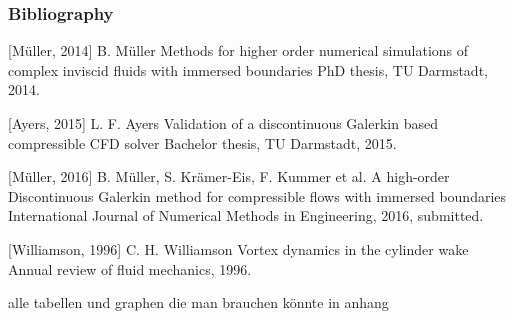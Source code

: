 \documentclass[accentcolor=tud7b,colorbacktitle,inverttitle,landscape,presentation,t]{tudbeamer}
\begin{document}
\begin{frame}[allowframebreaks]
	\frametitle{Bibliography}
\begin{thebibliography}{8}
	[Müller, 2014]
	B. Müller
	\newblock Methods for higher order numerical simulations of complex inviscid fluids with immersed boundaries
	\newblock PhD thesis, TU Darmstadt, 2014.
	
	[Ayers, 2015]
	L. F. Ayers
	\newblock Validation of a discontinuous Galerkin based compressible CFD solver
	\newblock Bachelor thesis, TU Darmstadt, 2015.
	
	[Müller, 2016]
	B. Müller, S. Krämer-Eis, F. Kummer et al.
	\newblock A high-order Discontinuous Galerkin method for compressible flows with immersed boundaries
	\newblock International Journal of Numerical Methods in Engineering, 2016, submitted.
	
	[Williamson, 1996]
	C. H. Williamson
	\newblock Vortex dynamics in the cylinder wake
	\newblock Annual review of fluid mechanics, 1996.
	
\end{thebibliography}
\end{frame}
\begin{frame}
	alle tabellen und graphen die man brauchen könnte in anhang
	\end{frame}	
\end{document}
